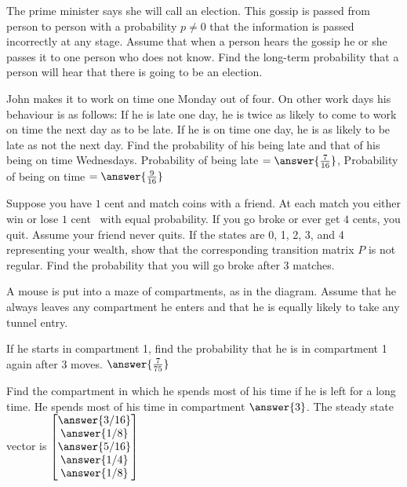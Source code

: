\documentclass{ximera}
\begin{document}
\begin{problem}\label{prob:election}
The prime minister says she will call an election. This gossip is passed from person to person with a probability $p \neq 0$ that the information is passed incorrectly at any stage. Assume that when a person hears the gossip he or she passes it to one person who does not know. Find the long-term probability that a person will hear that there is going to be an election.
\end{problem}

\begin{problem}\label{prob:late4work}
John makes it to work on time one Monday out of four. On other work days his behaviour is as follows: If he is late one day, he is twice as likely to come to work on time the next day as to be late. If he is on time one day, he is as likely to be late as not the next day. Find the probability of his being late and that of his being on time Wednesdays.
Probability of being late $= \answer{\frac{7}{16}}$, Probability of being on time $= \answer{\frac{9}{16}}$
\end{problem}

\begin{problem}\label{prob:matchcoins}
Suppose you have $1$ cent and match coins with a friend. At each match you either win or lose $1$ cent \ with equal probability. If you go broke or ever get $4$ cents, you quit. Assume your friend never quits. If the states are 0, 1, 2, 3, and 4 representing your wealth, show that the corresponding transition matrix $P$ is not regular. Find the probability that you will go broke after $3$ matches.
\end{problem}

\begin{problem}
A mouse is put into a maze of compartments, as in the diagram. Assume that he always leaves any compartment he enters and that he is equally likely to take any tunnel entry.

%

\begin{problem}\label{prob:mouse1} 
If he starts in compartment 1, find the probability that he is in compartment 1 again after $3$ moves.
$\answer{\frac{7}{75}}$
\end{problem}
\begin{problem}\label{prob:mouse2} 
Find the compartment in which he spends most of his time if he is left for a long time.
He spends most of his time in compartment $\answer{3}$.  The steady state vector is $\begin{bmatrix}
\answer{3/16} \\
\answer{1/8} \\
\answer{5/16} \\
\answer{1/4} \\
\answer{1/8}
\end{bmatrix}$
\end{problem}
\end{problem}
\end{document}
